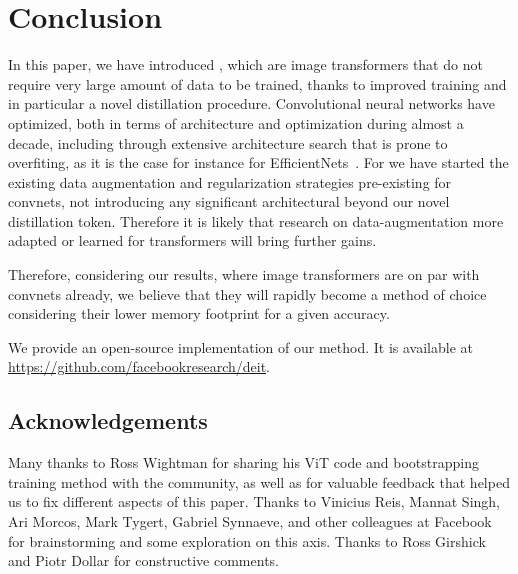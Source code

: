 \section{Conclusion}
\label{sec:conclusion}

In this paper, we have introduced \ours, which are image transformers that do not require very large amount of data to be trained, thanks to improved training and in particular a novel distillation procedure. 
% 
Convolutional neural networks have optimized, both in terms of architecture  and  optimization during almost a decade, including through extensive architecture search that is prone to overfiting, as it is the case for instance for EfficientNets~\cite{Touvron2020FixingTT}. For \ours we have started the existing data augmentation and regularization strategies pre-existing for convnets, not introducing any significant architectural beyond our novel distillation token. Therefore it is likely that research on data-augmentation more adapted or learned for transformers will bring further gains.  
 
Therefore, considering our results, where image transformers are on par with convnets already, we believe that they will rapidly become a method of choice considering their lower memory footprint for a given accuracy. 



We provide an open-source implementation of our method. It is available at
\url{https://github.com/facebookresearch/deit}.
\subsection*{Acknowledgements}

Many thanks to Ross Wightman for sharing his ViT code and bootstrapping training method with the community, as well as for valuable feedback that helped us to fix different aspects of this paper. Thanks to Vinicius Reis, Mannat Singh, Ari Morcos, Mark Tygert, Gabriel Synnaeve, and  other colleagues at Facebook for brainstorming and some exploration on this axis. Thanks to Ross Girshick and Piotr Dollar for constructive comments. 
